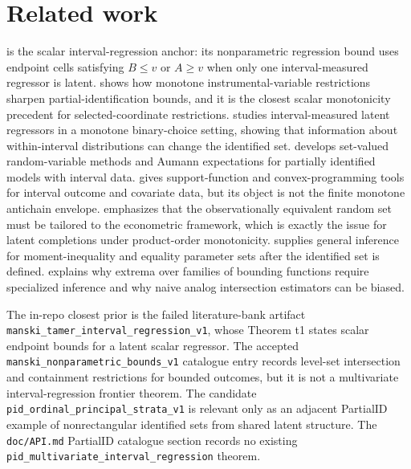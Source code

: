 \documentclass[11pt]{article}
\theoremstyle{definition}
\theoremstyle{plain}
\theoremstyle{remark}
\begin{document}
\section{Related work}
\citet{ManskiTamer2002IntervalRegression} is the scalar interval-regression anchor: its nonparametric regression bound uses endpoint cells satisfying \(B\le v\) or \(A\ge v\) when only one interval-measured regressor is latent.  \citet{ManskiPepper2000MIV} shows how monotone instrumental-variable restrictions sharpen partial-identification bounds, and it is the closest scalar monotonicity precedent for selected-coordinate restrictions.  \citet{MagnacMaurin2008MonotoneBinaryInterval} studies interval-measured latent regressors in a monotone binary-choice setting, showing that information about within-interval distributions can change the identified set.  \citet{BeresteanuMolinari2008SVRVInference} develops set-valued random-variable methods and Aumann expectations for partially identified models with interval data.  \citet{BeresteanuMolchanovMolinari2011ConvexMomentPredictions} gives support-function and convex-programming tools for interval outcome and covariate data, but its object is not the finite monotone antichain envelope.  \citet{BeresteanuMolchanovMolinari2012RandomSetTheory} emphasizes that the observationally equivalent random set must be tailored to the econometric framework, which is exactly the issue for latent completions under product-order monotonicity.  \citet{ChernozhukovHongTamer2007ParameterSets} supplies general inference for moment-inequality and equality parameter sets after the identified set is defined.  \citet{ChernozhukovLeeRosen2013IntersectionBounds} explains why extrema over families of bounding functions require specialized inference and why naive analog intersection estimators can be biased.

The in-repo closest prior is the failed literature-bank artifact \texttt{manski\_tamer\_interval\_regression\_v1}, whose Theorem t1 states scalar endpoint bounds for a latent scalar regressor.  The accepted \texttt{manski\_nonparametric\_bounds\_v1} catalogue entry records level-set intersection and containment restrictions for bounded outcomes, but it is not a multivariate interval-regression frontier theorem.  The candidate \texttt{pid\_ordinal\_principal\_strata\_v1} is relevant only as an adjacent PartialID example of nonrectangular identified sets from shared latent structure.  The \texttt{doc/API.md} PartialID catalogue section records no existing \texttt{pid\_multivariate\_interval\_regression} theorem.
\end{document}

